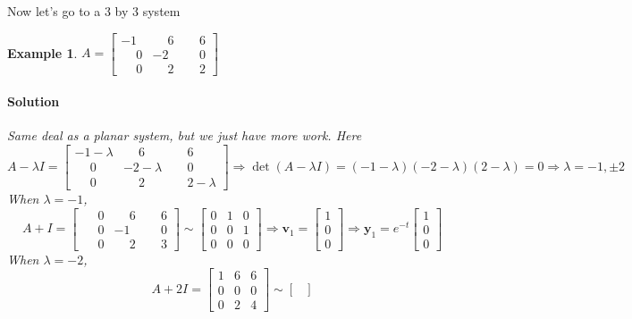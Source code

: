 \documentclass[letterpaper, 11pt, openany]{book}
\theoremstyle{mytheoremstyle}
\theoremstyle{myexamplestyle}
\newtheorem{example}{Example}[section]
\newenvironment{solution}{\paragraph{\sffamily \smaller \fontseries{b}\selectfont Solution}}{\hfill\faSquare}
\begin{document}
Now let's go to a 3 by 3 system \faSmile

\begin{example}
    \(A = \begin{bmatrix}
        -1 &  \phantom{-}6 &  \phantom{-}6\\
         \phantom{-}0 & -2 &  \phantom{-}0\\
         \phantom{-}0 &  \phantom{-}2 &  \phantom{-}2
    \end{bmatrix}\)
    \begin{solution}
        Same deal as a planar system, but we just have more work. Here
        \[A - \lambda I = \begin{bmatrix}
            -1 - \lambda &  \phantom{-}6 &  \phantom{-}6\\
             \phantom{-}0 & -2 - \lambda &  \phantom{-}0\\
             \phantom{-}0 &  \phantom{-}2 &  \phantom{-}2 - \lambda
        \end{bmatrix} \Rightarrow \det(A- \lambda I) = (-1-\lambda)(-2 - \lambda)(2-\lambda) = 0 \Rightarrow \lambda = -1, \pm 2\]
        When \(\lambda = -1\),
        \[A + I = \begin{bmatrix}
             \phantom{-}0 &  \phantom{-}6 &  \phantom{-}6 \\
             \phantom{-}0 & -1 &  \phantom{-}0 \\
             \phantom{-}0 &  \phantom{-}2 &  \phantom{-}3
        \end{bmatrix} \sim \begin{bmatrix}
            0 & 1 & 0 \\
            0 & 0 & 1 \\
            0 & 0 & 0 
        \end{bmatrix} \Rightarrow \mathbf{v}_{1} = \begin{bmatrix}
            1 \\ 0 \\ 0
        \end{bmatrix} \Rightarrow \mathbf{y}_{1} = e^{-t}\begin{bmatrix}
            1 \\ 0 \\ 0
        \end{bmatrix}\]
        When \(\lambda = -2\),
        \[A + 2I = \begin{bmatrix}
            1 & 6 & 6 \\
            0 & 0 & 0 \\
            0 & 2 & 4
        \end{bmatrix} \sim \begin{bmatrix}

\end{bmatrix}\]
\end{solution}
\end{example}
\end{document}
